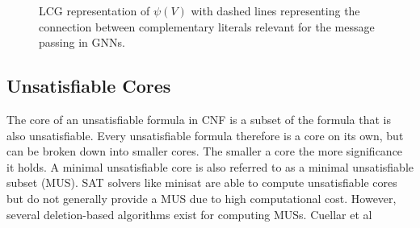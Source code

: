 \begin{figure}[h]
    \centering
    \caption{LCG representation of $\psi(V)$ with dashed lines representing the connection between complementary literals relevant for the message passing in GNNs.}
    \label{fig:lcg-sat}
\end{figure}


\subsection{Unsatisfiable Cores}
The core of an unsatisfiable formula in CNF is a subset of the formula that is also unsatisfiable. Every unsatisfiable formula therefore is a core on its own, but can be broken down into smaller cores. The smaller a core the more significance it holds. A minimal unsatisfiable core is also referred to as a minimal unsatisfiable subset (MUS). SAT solvers like minisat\cite{} are able to compute unsatisfiable cores but do not generally provide a MUS due to high computational cost. However, several deletion-based algorithms exist for computing MUSs. Cuellar et al \cite{}

